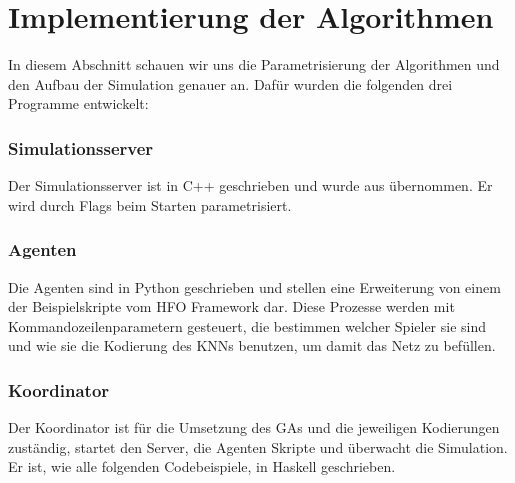 \newpage

    \section{Implementierung der Algorithmen}
        In diesem Abschnitt schauen wir uns die Parametrisierung der Algorithmen und den Aufbau der Simulation genauer an. Dafür wurden die folgenden drei Programme entwickelt:

        \subsubsection*{Simulationsserver}
        Der Simulationsserver ist in C++ geschrieben und wurde aus \cite{hfo} übernommen. Er wird durch Flags beim Starten parametrisiert. 

        \subsubsection*{Agenten}
        Die Agenten sind in Python geschrieben und stellen eine Erweiterung von einem der Beispielskripte vom HFO Framework \cite{hfo} dar. Diese Prozesse werden mit Kommandozeilenparametern gesteuert, die bestimmen welcher Spieler sie sind und wie sie die Kodierung des KNNs benutzen, um damit das Netz zu befüllen.

        \subsubsection*{Koordinator}
        Der Koordinator ist für die Umsetzung des GAs und die jeweiligen Kodierungen zuständig, startet den Server, die Agenten Skripte und überwacht die Simulation. Er ist, wie alle folgenden Codebeispiele, in Haskell geschrieben.


